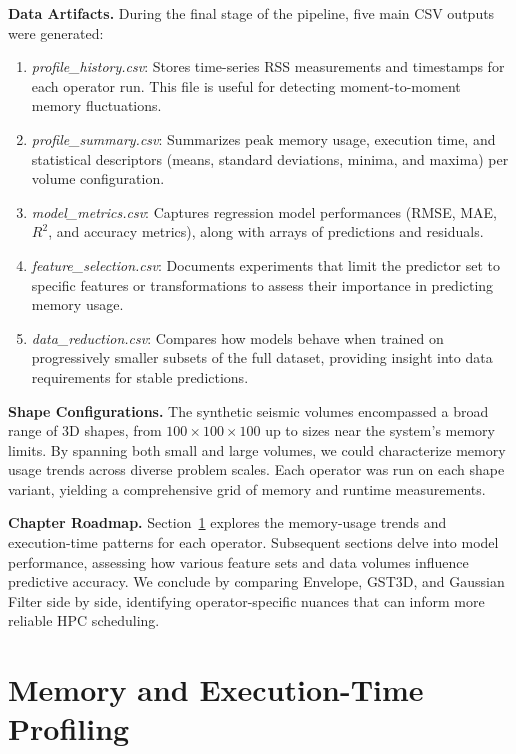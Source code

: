\vspace{1em}
\noindent
\textbf{Data Artifacts.}
During the final stage of the pipeline, five main \ac{CSV} outputs were generated:
\begin{enumerate}
    \item \emph{profile\_history.csv}: Stores time-series \ac{RSS} measurements and timestamps for each operator run. This file is useful for detecting moment-to-moment memory fluctuations.
    \item \emph{profile\_summary.csv}: Summarizes peak memory usage, execution time, and statistical descriptors (means, standard deviations, minima, and maxima) per volume configuration.
    \item \emph{model\_metrics.csv}: Captures regression model performances (\ac{RMSE}, \ac{MAE}, $R^2$, and accuracy metrics), along with arrays of predictions and residuals.
    \item \emph{feature\_selection.csv}: Documents experiments that limit the predictor set to specific features or transformations to assess their importance in predicting memory usage.
    \item \emph{data\_reduction.csv}: Compares how models behave when trained on progressively smaller subsets of the full dataset, providing insight into data requirements for stable predictions.
\end{enumerate}

\vspace{1em}
\noindent
\textbf{Shape Configurations.}
The synthetic seismic volumes encompassed a broad range of \ac{3D} shapes, from $100 \times 100 \times 100$ up to sizes near the system’s memory limits.
By spanning both small and large volumes, we could characterize memory usage trends across diverse problem scales.
Each operator was run on each shape variant, yielding a comprehensive grid of memory and runtime measurements.

\vspace{1em}
\noindent
\textbf{Chapter Roadmap.}
Section~\ref{sec:pmc-results-memory-and-execution-time-profiling} explores the memory-usage trends and execution-time patterns for each operator.
Subsequent sections delve into model performance, assessing how various feature sets and data volumes influence predictive accuracy.
We conclude by comparing Envelope, \ac{GST3D}, and Gaussian Filter side by side, identifying operator-specific nuances that can inform more reliable \ac{HPC} scheduling.


\section{Memory and Execution-Time Profiling}
\label{sec:pmc-results-memory-and-execution-time-profiling}

